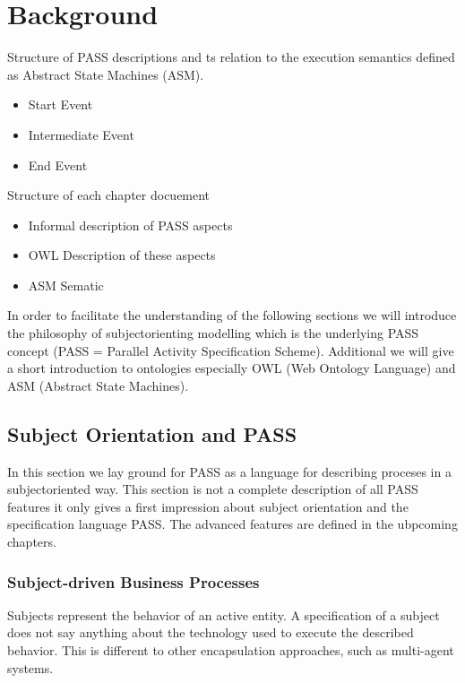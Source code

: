 \chapter{Background}
Structure of PASS descriptions and ts relation to the execution semantics defined as Abstract State Machines (ASM).

\begin{itemize}
	\item Start Event
	\item Intermediate Event
	\item End Event
\end{itemize}


Structure of each chapter docuement
\begin{itemize}
	\item Informal description of PASS aspects
	\item OWL Description of these aspects
	\item ASM Sematic
\end{itemize}



In order to facilitate the understanding of the following sections we will introduce the philosophy of subjectorienting modelling which is the underlying PASS concept (PASS = Parallel Activity Specification Scheme). Additional we will give a short introduction to ontologies especially OWL (Web Ontology Language) and ASM (Abstract State Machines).



\section{Subject Orientation and PASS }

In this section we lay ground for PASS as a language for describing proceses in a subjectoriented way. This section is not a complete description of all PASS features it only gives a first impression about subject orientation and the specification language PASS. The advanced features are defined in the ubpcoming chapters.

\subsection{Subject-driven Business Processes}
Subjects represent the behavior of an active entity. A specification of a subject does not say anything about the technology used to execute the described behavior. This is different to other encapsulation approaches, such as multi-agent systems.\\ 

